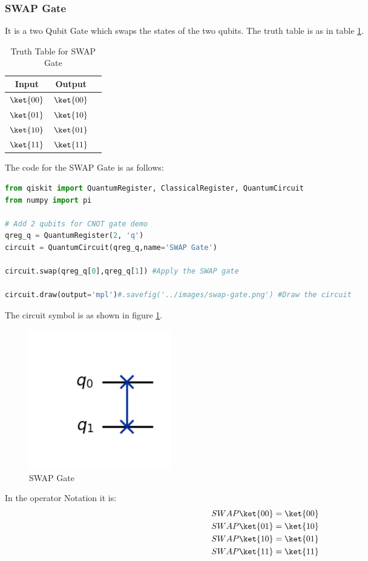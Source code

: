 \documentclass[12pt, oneside]{book}
\theoremstyle{definition}
\theoremstyle{definition}
\theoremstyle{remark}
\begin{document}
\subsubsection{SWAP Gate}
It is a two Qubit Gate which swaps the states of the two qubits.
The truth table is as in table \ref{tab:swap}.
\begin{table}[H]
    \centering
    \begin{tabular}{|c|c|c|}
        \hline
        Input & Output\\
        \hline
        $\ket{00}$ & $\ket{00}$\\
        $\ket{01}$   & $\ket{10}$\\
        $\ket{10}$   & $\ket{01}$\\
        $\ket{11}$  & $\ket{11}$\\
        \hline
    \end{tabular}
    \caption{Truth Table for SWAP Gate}
    \label{tab:swap}
\end{table}
The code for the SWAP Gate is as follows:
\begin{lstlisting}[language=Python]
from qiskit import QuantumRegister, ClassicalRegister, QuantumCircuit
from numpy import pi

# Add 2 qubits for CNOT gate demo
qreg_q = QuantumRegister(2, 'q')
circuit = QuantumCircuit(qreg_q,name='SWAP Gate')

circuit.swap(qreg_q[0],qreg_q[1]) #Apply the SWAP gate

circuit.draw(output='mpl')#.savefig('../images/swap-gate.png') #Draw the circuit
\end{lstlisting}

The circuit symbol is as shown in figure \ref{fig:swap}.
\begin{figure}[H]
    \centering
    \includegraphics[width=0.3\textwidth]{../images/swap-gate.png}
    \caption{SWAP Gate}
    \label{fig:swap}
\end{figure}

In the operator Notation it is:
\begin{align*}
    SWAP\ket{00}&=\ket{00} \\
    SWAP\ket{01}&=\ket{10} \\
    SWAP\ket{10}&=\ket{01} \\
    SWAP\ket{11}&=\ket{11}
\end{align*}
\end{document}
